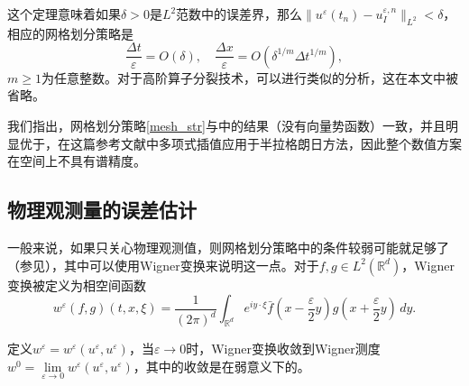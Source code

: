 这个定理意味着如果$\delta>0$是$L^2$范数中的误差界，那么$\|u^\varepsilon(t_n)-u^{\varepsilon,n}_I\|_{L^2}<\delta$，相应的网格划分策略是
\begin{equation}\label{mesh_str}
\frac{\Delta t}{\varepsilon}=O(\delta),\quad \frac{\Delta x}{\varepsilon}=O(\delta^{1/m}\Delta t^{1/m}),
\end{equation}
$m\geq 1$为任意整数。对于高阶算子分裂技术，可以进行类似的分析，这在本文中被省略。

我们指出，网格划分策略\eqref{mesh_str}与中的结果（没有向量势函数）一致，并且明显优于，在这篇参考文献中多项式插值应用于半拉格朗日方法，因此整个数值方案在空间上不具有谱精度。


\subsection{物理观测量的误差估计}
一般来说，如果只关心物理观测值，则网格划分策略中的条件较弱可能就足够了（参见），其中可以使用Wigner变换来说明这一点。对于$f,g\in L^2(\mathbb{R}^d)$，Wigner变换被定义为相空间函数
\begin{equation}
w^\varepsilon(f,g)(t,x,\xi)=\frac{1}{(2\pi)^d}\int_{\mathbb{R}^d}e^{iy\cdot\xi}\bar{f}(x-\frac{\varepsilon}{2}y)g(x+\frac{\varepsilon}{2}y)\,dy.
\end{equation}

定义$w^\varepsilon=w^\varepsilon(u^\varepsilon,u^\varepsilon)$，当$\varepsilon\rightarrow 0$时，Wigner变换收敛到Wigner测度$w^0=\lim\limits_{\varepsilon\rightarrow 0}w^\varepsilon(u^\varepsilon,u^\varepsilon)$，其中的收敛是在弱意义下的。


